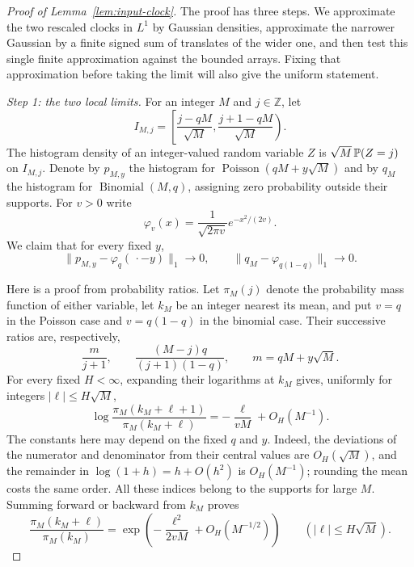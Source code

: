\begin{proof}[Proof of Lemma~\ref{lem:input-clock}]
The proof has three steps.  We approximate the two rescaled clocks in
\(L^1\) by Gaussian densities, approximate the narrower Gaussian by a
finite signed sum of translates of the wider one, and then test this
single finite approximation against the bounded arrays.  Fixing that
approximation before taking the limit will also give the uniform statement.

\emph{Step 1: the two local limits.}
For an integer
$M$ and $j\in\mathbb Z$, let
\[
 I_{M,j}=\left[\frac{j-q M}{\sqrt M},
                   \frac{j+1-q M}{\sqrt M}\right).
\]
The histogram density of an integer-valued random variable $Z$ is
$\sqrt M\,\P(Z=j)$ on $I_{M,j}$.  Denote by $p_{M,y}$ the histogram
for $\operatorname{Poisson}(q M+y\sqrt M)$ and by $q_M$ the
histogram for $\operatorname{Binomial}(M,q)$, assigning zero
probability outside their supports.  For $v>0$ write
\[
 \varphi_v(x)=\frac{1}{\sqrt{2\pi v}}e^{-x^2/(2v)}.
\]
We claim that for every fixed $y$,
\begin{equation}
 \|p_{M,y}-\varphi_q(\,\cdot-y)\|_1\longrightarrow0,
 \qquad
 \|q_M-\varphi_{q(1-q)}\|_1\longrightarrow0.
 \label{eq:inputclock-local-limits}
\end{equation}

Here is a proof from probability ratios.  Let $\pi_M(j)$ denote the
probability mass function of either variable, let $k_M$ be an integer
nearest its mean, and put $v=q$ in the Poisson case and
$v=q(1-q)$ in the binomial case.  Their successive ratios
are, respectively,
\[
 \frac{m}{j+1},\qquad
 \frac{(M-j)q}{(j+1)(1-q)},
 \qquad m=q M+y\sqrt M.
\]
For every fixed $H<\infty$, expanding their logarithms at $k_M$
gives, uniformly for integers $|\ell|\le H\sqrt M$,
\[
 \log\frac{\pi_M(k_M+\ell+1)}{\pi_M(k_M+\ell)}
 =-\frac{\ell}{vM}+O_H(M^{-1}).
\]
The constants here may depend on the fixed $q$ and $y$.  Indeed,
the deviations of the numerator and denominator from their central
values are $O_H(\sqrt M)$, and the remainder in
$\log(1+h)=h+O(h^2)$ is $O_H(M^{-1})$; rounding the mean costs the
same order.  All these indices belong to the supports for large $M$.
Summing forward or backward from $k_M$ proves
\begin{equation}
 \frac{\pi_M(k_M+\ell)}{\pi_M(k_M)}
 =\exp\left(-\frac{\ell^2}{2vM}+O_H(M^{-1/2})\right)
 \qquad(|\ell|\le H\sqrt M).
 \label{eq:inputclock-ratio-expansion}
\end{equation}


\end{proof}
